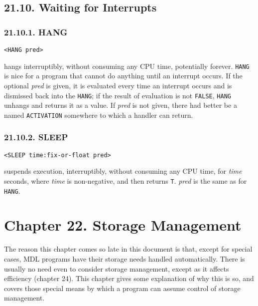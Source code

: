 \documentclass[a4paper,]{article}
\begin{document}
\subsection{21.10. Waiting for Interrupts}\label{waiting-for-interrupts}

\subsubsection{21.10.1. HANG}\label{hang}

\begin{verbatim}
<HANG pred>
\end{verbatim}

 hangs interruptibly, without consuming any CPU time, potentially forever. \texttt{HANG} is
nice for a program that cannot do anything until an interrupt occurs. If the optional \emph{pred} is given, it is evaluated
every time an interrupt occurs and is dismissed back into the \texttt{HANG}; if the result of evaluation is not
\texttt{FALSE}, \texttt{HANG} unhangs and returns it as a value. If \emph{pred} is not given, there had better be a named
\texttt{ACTIVATION} somewhere to which a handler can return.

\subsubsection{21.10.2. SLEEP}\label{sleep}

\begin{verbatim}
<SLEEP time:fix-or-float pred>
\end{verbatim}

 suspends execution, interruptibly, without consuming any CPU time, for \emph{time} seconds,
where \emph{time} is non-negative, and then returns \texttt{T}. \emph{pred} is the same as for \texttt{HANG}.

\section{Chapter 22. Storage Management}\label{chapter-22.-storage-management}

The reason this chapter comes so late in this document is that, except for special cases, MDL programs have their storage
needs handled automatically. There is usually no need even to consider storage management, except as it affects efficiency
(chapter 24). This chapter gives some explanation of why this is so, and covers those special means by which a program can
assume control of storage management.
\end{document}
